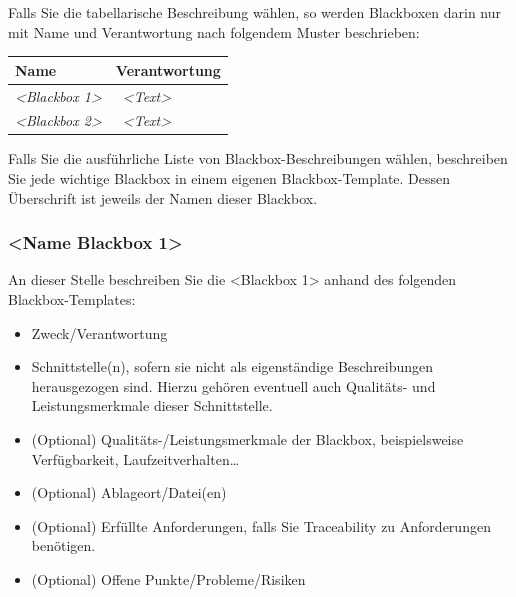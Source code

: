 \documentclass[]{article}
\begin{document}
Falls Sie die tabellarische Beschreibung wählen, so werden Blackboxen
darin nur mit Name und Verantwortung nach folgendem Muster beschrieben:

\begin{longtable}[]{@{}ll@{}}
\toprule
\begin{minipage}[b]{0.31\columnwidth}\raggedright\strut
\textbf{Name}\strut
\end{minipage} & \begin{minipage}[b]{0.63\columnwidth}\raggedright\strut
\textbf{Verantwortung}\strut
\end{minipage}\tabularnewline
\midrule
\endhead
\begin{minipage}[t]{0.31\columnwidth}\raggedright\strut
\emph{\textless{}Blackbox 1\textgreater{}}\strut
\end{minipage} & \begin{minipage}[t]{0.63\columnwidth}\raggedright\strut
~\emph{\textless{}Text\textgreater{}}\strut
\end{minipage}\tabularnewline
\begin{minipage}[t]{0.31\columnwidth}\raggedright\strut
\emph{\textless{}Blackbox 2\textgreater{}}\strut
\end{minipage} & \begin{minipage}[t]{0.63\columnwidth}\raggedright\strut
~\emph{\textless{}Text\textgreater{}}\strut
\end{minipage}\tabularnewline
\bottomrule
\end{longtable}

Falls Sie die ausführliche Liste von Blackbox-Beschreibungen wählen,
beschreiben Sie jede wichtige Blackbox in einem eigenen
Blackbox-Template. Dessen Überschrift ist jeweils der Namen dieser
Blackbox.

\subsubsection{\textless{}Name Blackbox
1\textgreater{}}\label{__name_blackbox_1}

An dieser Stelle beschreiben Sie die \textless{}Blackbox 1\textgreater{}
anhand des folgenden Blackbox-Templates:

\begin{itemize}
\item
  Zweck/Verantwortung
\item
  Schnittstelle(n), sofern sie nicht als eigenständige Beschreibungen
  herausgezogen sind. Hierzu gehören eventuell auch Qualitäts- und
  Leistungsmerkmale dieser Schnittstelle.
\item
  (Optional) Qualitäts-/Leistungsmerkmale der Blackbox, beispielsweise
  Verfügbarkeit, Laufzeitverhalten\ldots{}
\item
  (Optional) Ablageort/Datei(en)
\item
  (Optional) Erfüllte Anforderungen, falls Sie Traceability zu
  Anforderungen benötigen.
\item
  (Optional) Offene Punkte/Probleme/Risiken
\end{itemize}
\end{document}

